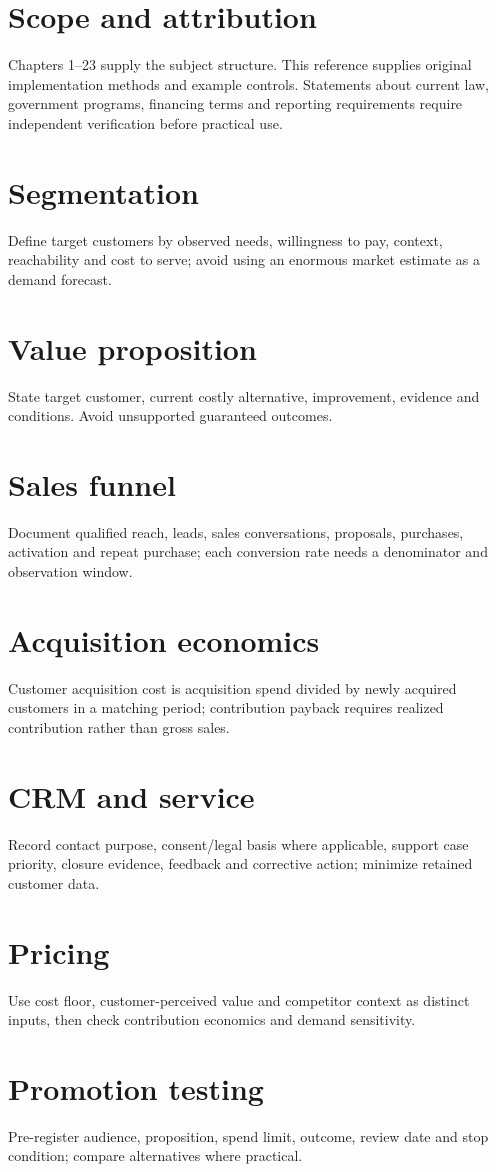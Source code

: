 \documentclass[11pt]{article}
\begin{document}
\SuiteOpen\tableofcontents
\section{Scope and attribution}
Chapters 1--23 supply the subject structure. This reference supplies original implementation methods and example controls. Statements about current law, government programs, financing terms and reporting requirements require independent verification before practical use.
\section{Segmentation}
Define target customers by observed needs, willingness to pay, context, reachability and cost to serve; avoid using an enormous market estimate as a demand forecast.
\section{Value proposition}
State target customer, current costly alternative, improvement, evidence and conditions. Avoid unsupported guaranteed outcomes.
\section{Sales funnel}
Document qualified reach, leads, sales conversations, proposals, purchases, activation and repeat purchase; each conversion rate needs a denominator and observation window.
\section{Acquisition economics}
Customer acquisition cost is acquisition spend divided by newly acquired customers in a matching period; contribution payback requires realized contribution rather than gross sales.
\section{CRM and service}
Record contact purpose, consent/legal basis where applicable, support case priority, closure evidence, feedback and corrective action; minimize retained customer data.
\section{Pricing}
Use cost floor, customer-perceived value and competitor context as distinct inputs, then check contribution economics and demand sensitivity.
\section{Promotion testing}
Pre-register audience, proposition, spend limit, outcome, review date and stop condition; compare alternatives where practical.
\end{document}
